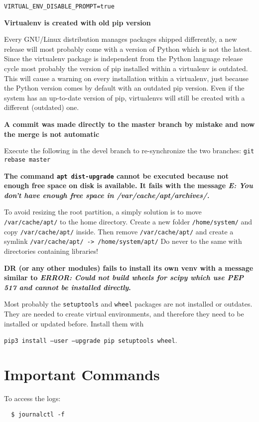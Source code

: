 \documentclass[a4paper,12pt]{article}
\begin{document}
{\tt VIRTUAL\_ENV\_DISABLE\_PROMPT=true}

\textbf{Virtualenv is created with old pip version}

Every GNU/Linux distribution manages packages shipped differently, a new release will most probably come with a version of Python which is not the latest. Since the virtualenv package is independent from the Python language release cycle most probably the version of pip installed within a virtualenv is outdated. This will cause a warning on every installation within a virtualenv, just because the Python version comes by default with an outdated pip version. Even if the system has an up-to-date version of pip, virtualenvs will still be created with a different (outdated) one.

\textbf{A commit was made directly to the master branch by mistake and now the merge is not automatic}

Execute the following in the devel branch to re-synchronize the two branches: {\tt git rebase master}

\textbf{The command {\tt apt dist-upgrade} cannot be executed because not enough free space on disk is available. It fails with the message \emph{E: You don't have enough free space in /var/cache/apt/archives/.}}

To avoid resizing the root partition, a simply solution is to move {\tt /var/cache/apt/} to the home directory.
Create a new folder {\tt /home/system/} and copy {\tt /var/cache/apt/} inside. Then remove {\tt /var/cache/apt/} and create a symlink {\tt /var/cache/apt/ -> /home/system/apt/}
Do never to the same with directories containing libraries!

\textbf{DR (or any other modules) fails to install its own venv with a message similar to \emph{ERROR: Could not build wheels for scipy which use PEP 517 and cannot be installed directly}.}

Most probably the {\tt setuptools} and {\tt wheel} packages are not installed or outdates. They are needed to create virtual environments, and therefore they need to be installed or updated before. Install them with

{\tt pip3 install --user --upgrade pip setuptools wheel}.






\section{Important Commands}
To access the logs:

\begin{verbatim}
  $ journalctl -f
\end{verbatim}
\end{document}
